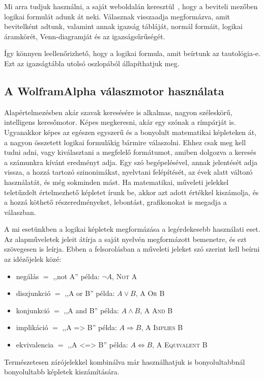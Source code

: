 \documentclass[
]{thesis-ekf}
\theoremstyle{definition}
\theoremstyle{remark}
\begin{document}
	Mi arra tudjuk használni, a saját weboldalán keresztül~\cite{link-wolframalpha}, hogy a beviteli mezőben logikai formulát adunk át neki. Válasznak visszaadja megformázva, amit bevitelként adtunk, valamint annak igazság tábláját, normál formáit, logikai áramkörét, Venn-diagramját és az igazságsűrűségét.
	
	Így könnyen leellenőrizhető, hogy a logikai formula, amit beírtunk az tautológia-e. Ezt az igazságtábla utolsó oszlopából állapíthatjuk meg.
	
		\subsection{A WolframAlpha válaszmotor használata} \label{ssec-wolframalpha-hasznalata}
	Alapértelmezésben akár szavak keresésére is alkalmas, nagyon széleskörű, intelligens keresőmotor. Képes megkeresni, akár egy szónak a rímpárját is. Ugyanakkor képes az egészen egyszerű és a bonyolult matematikai képleteken át, a nagyon összetett logikai formulákig bármire válaszolni. Ehhez csak meg kell tudni adni, vagy kiválasztani a megfelelő formátumot, amiben dolgozva a keresés a számunkra kívánt eredményt adja. Egy szó begépelésével, annak jelentését adja vissza, a hozzá tartozó szinonimákat, nyelvtani felépítését, az évek alatt változó használatát, és még sokminden mást. Ha matematikai, műveleti jelekkel teletűzdelt értelmezhető képletet írunk be, akkor azt adott értékkel kiszámolja, és a hozzá köthető részeredményeket, lebontást, grafikonokat is megadja a válaszban.
	
	A mi esetünkben a logikai képletek megformázása a legérdekesebb használati eset. Az alapműveletek jeleit átírja a saját nyelvén megformázott bemenetre, és ezt szövegesen is leírja. Ebben a felsorolásban a műveleti jeleket szó szerint kell beírni az idézőjelek közé:
	\begin{itemize}
		\item negálás $ = $ ,,not A'' példa: $ \neg A $, \textsc{Not A}
		\item diszjunkció $ = $ ,,A or B'' példa: $ A\vee B $, \textsc{A Or B}
		\item konjunkció $ = $ ,,A and B'' példa: $ A\wedge B $, \textsc{A And B}
		\item implikáció $ = $ ,,A => B'' példa: $ A\Rightarrow B $, \textsc{A Implies B}
		\item ekvivalencia $ = $ ,,A <=> B'' példa: $ A\Leftrightarrow B $, \textsc{A Equivalent B}
	\end{itemize}
	Természetesen zárójelekkel kombinálva már használhatjuk is bonyolultabbnál bonyolultabb képletek kiszámítására.
	
\end{document}
